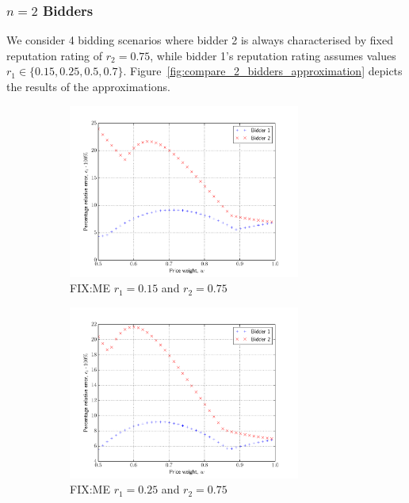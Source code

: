 \subsubsection{$n=2$ Bidders} %
\label{ssub:n_2_bidders_approximation}
We consider 4 bidding scenarios where bidder 2 is always characterised by fixed reputation rating of $r_2=0.75$, while bidder 1's reputation rating assumes values $r_1\in\{0.15, 0.25, 0.5, 0.7\}$. Figure~\ref{fig:compare_2_bidders_approximation} depicts the results of the approximations.

\begin{figure}[p!]
  \vspace{0.5cm}
  \begin{subfigure}[b]{0.5\textwidth}
    \includegraphics[width=3in]{Approximation/Figures/compare_2_bidders_015_075}
    \caption{FIX:ME $r_1=0.15$ and $r_2=0.75$}
    \label{fig:compare_2_bidders_015_075_approximation}
  \end{subfigure}
  \begin{subfigure}[b]{0.5\textwidth}
    \includegraphics[width=3in]{Approximation/Figures/compare_2_bidders_025_075}
    \caption{FIX:ME $r_1=0.25$ and $r_2=0.75$}
    \label{fig:compare_2_bidders_025_075_approximation}
  \end{subfigure}
  \vspace{0.5cm}\\
  \begin{subfigure}[b]{0.5\textwidth}

\end{subfigure}
\end{figure}
